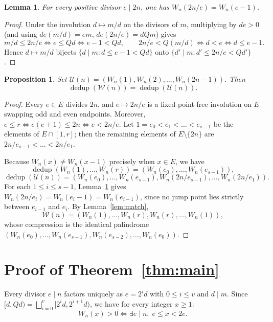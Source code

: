 \documentclass[11pt]{article}
\newtheorem{proposition}[theorem]{Proposition}
\newtheorem{lemma}[theorem]{Lemma}
\begin{document}
\begin{lemma}\label{lem:rev}
For every positive divisor $e \mid 2n$, one has $W_n(2n / e) = W_n(e - 1)$.
\end{lemma}

\begin{proof}
Under the involution $d \mapsto m/d$ on the divisors of $m$, multiplying by $de > 0$ (and using $de(m/d) = em$, $de(2n/e) = dQm$) gives
\[
  m/d \le 2n/e \iff e \le Qd \iff e - 1 < Qd, \qquad 2n/e < Q(m/d) \iff d < e \iff d \le e - 1.
\]
Hence $d \mapsto m/d$ bijects $\{d \mid m : d \le e - 1 < Qd\}$ onto $\{d' \mid m : d' \le 2n/e < Qd'\}$.
\end{proof}

\begin{proposition}\label{prop:dedup}
Set $\mathcal{U}(n) = (W_n(1), W_n(2), \dots, W_n(2n-1))$. Then
\[
  \operatorname{dedup}(\mathcal{W}(n)) = \operatorname{dedup}(\mathcal{U}(n)).
\]
\end{proposition}

\begin{proof}
Every $e \in E$ divides $2n$, and $e \mapsto 2n/e$ is a fixed-point-free involution on $E$ swapping odd and even endpoints. Moreover, $e \le r \iff e(e+1) \le 2n \iff e < 2n/e$. Let $1 = e_0 < e_1 < \dots < e_{s-1}$ be the elements of $E \cap [1, r]$; then the remaining elements of $E \setminus \{2n\}$ are $2n/e_{s-1} < \dots < 2n/e_1$.

Because $W_n(x) \ne W_n(x-1)$ precisely when $x \in E$, we have
\[
  \operatorname{dedup}(W_n(1), \dots, W_n(r)) = (W_n(e_0), \dots, W_n(e_{s-1})),
\]
\[
  \operatorname{dedup}(\mathcal{U}(n)) = (W_n(e_0), \dots, W_n(e_{s-1}), W_n(2n/e_{s-1}), \dots, W_n(2n/e_1)).
\]
For each $1 \le i \le s-1$, Lemma~\ref{lem:rev} gives $W_n(2n/e_i) = W_n(e_i - 1) = W_n(e_{i-1})$, since no jump point lies strictly between $e_{i-1}$ and $e_i$. By Lemma~\ref{lem:match},
\[
  \mathcal{W}(n) = (W_n(1), \dots, W_n(r), W_n(r), \dots, W_n(1)),
\]
whose compression is the identical palindrome $(W_n(e_0), \dots, W_n(e_{s-1}), W_n(e_{s-2}), \dots, W_n(e_0))$.
\end{proof}

\section{Proof of Theorem~\ref{thm:main}}

Every divisor $e \mid n$ factors uniquely as $e = 2^i d$ with $0 \le i \le v$ and $d \mid m$. Since $[d, Qd) = \bigsqcup_{i=0}^v [2^i d, 2^{i+1} d)$, we have for every integer $x \ge 1$:
\begin{equation}\label{eq:W-pos}
  W_n(x) > 0 \iff \exists e \mid n,\; e \le x < 2e.
\end{equation}
\end{document}
